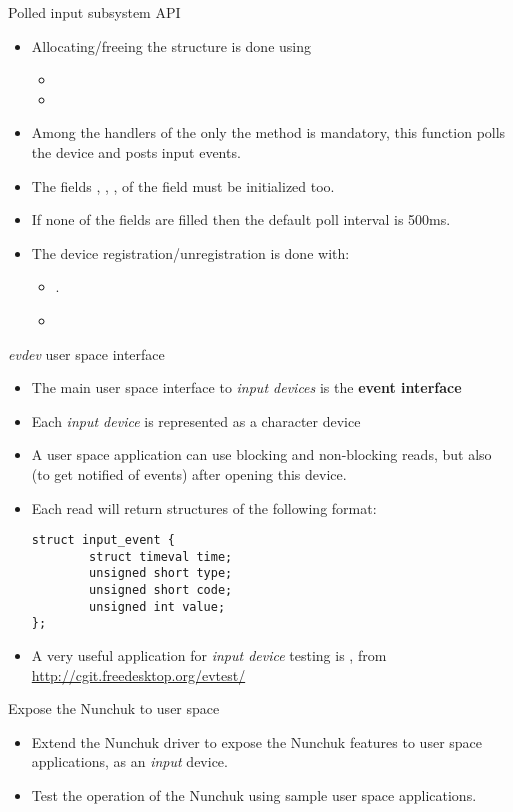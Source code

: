 \begin{frame}[fragile]{Polled input subsystem API}
  \begin{itemize}
  \item Allocating/freeing the  structure is
    done using
    \begin{itemize}
    \item {}
    \item {}
    \end{itemize}
  \item Among the handlers of the  only the
     method is mandatory, this function polls the device
    and posts input events.
  \item The fields , , ,  of
    the  field must be initialized too.
  \item If none of the  fields are filled then the
    default poll interval is 500ms.
  \item The device registration/unregistration is done with:
    \begin{itemize}
    \item {}.
    \item {}
    \end{itemize}
  \end{itemize}
\end{frame}

\begin{frame}[fragile]{{\em evdev} user space interface}
  \begin{itemize}
  \item The main user space interface to {\em input devices} is the
    {\bf event interface}
  \item Each {\em input device} is represented as a
     character device
  \item A user space application can use blocking and non-blocking
    reads, but also  (to get notified of events) after
    opening this device.
  \item Each read will return  structures of the
    following format:
    \begin{block}{}
    \begin{verbatim}
struct input_event {
        struct timeval time;
        unsigned short type;
        unsigned short code;
        unsigned int value;
};
\end{verbatim}
\end{block}
\item A very useful application for {\em input device} testing is
  , from \url{http://cgit.freedesktop.org/evtest/}
  \end{itemize}
\end{frame}

\setuplabframe
{Expose the Nunchuk to user space}
{
  \begin{itemize}
  \item Extend the Nunchuk driver to expose the Nunchuk features to
    user space applications, as an {\em input} device.
  \item Test the operation of the Nunchuk using sample user space
    applications.
  \end{itemize}
}
